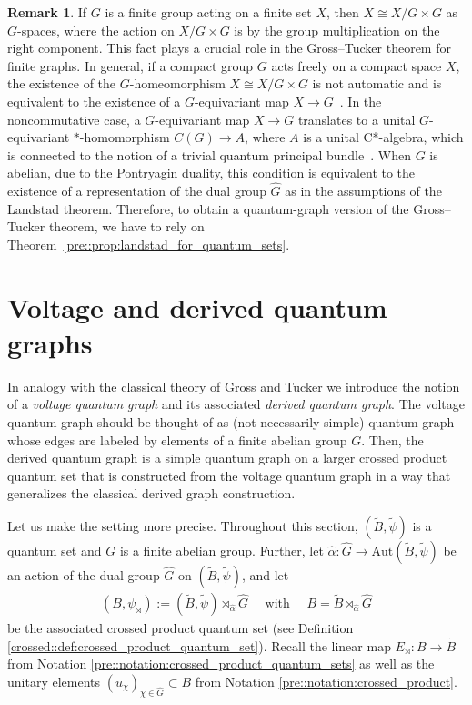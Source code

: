 \documentclass{amsart}
\theoremstyle{definition}
\newtheorem{remark}[thm]{Remark}
\theoremstyle{definition}
\begin{document}
\begin{remark}
    If $G$ is a finite group acting on a finite set $X$, then $X\cong X/G\times G$ as $G$-spaces, where the action on $X/G\times G$ is by the group multiplication on the right component. This fact plays a crucial role in the Gross--Tucker theorem for finite graphs. In general, if a compact group $G$ acts freely on a compact space $X$, the existence of the $G$-homeomorphism $X\cong X/G\times G$ is not automatic and is equivalent to the existence of a $G$-equivariant map $X\to G$~\cite{husemoller_bundles_1994}. In the noncommutative case, a $G$-equivariant map $X\to G$ translates to a unital $G$-equivariant $*$-homomorphism $C(G)\to A$, where $A$ is a unital C*-algebra, which is connected to the notion of a trivial quantum principal bundle~\cite{baum_hajac_dabrowski_bu_2015}. When $G$ is abelian, due to the Pontryagin duality, this condition is equivalent to the existence of a representation of the dual group $\hat{G}$ as in the assumptions of the Landstad theorem. Therefore, to obtain a quantum-graph version of the Gross--Tucker theorem, we have to rely on Theorem~\ref{pre::prop:landstad_for_quantum_sets}.
\end{remark}


\section{Voltage and derived quantum graphs}
\label{sec::qvoltage_and_derived_graphs}

In analogy with the classical theory of Gross and Tucker we introduce the notion of a \emph{voltage quantum graph} and its associated \emph{derived quantum graph}. The voltage quantum graph should be thought of as (not necessarily simple) quantum graph whose edges are labeled by elements of a finite abelian group $G$. Then, the derived quantum graph is a simple quantum graph on a larger crossed product quantum set that is constructed from the voltage quantum graph in a way that generalizes the classical derived graph construction.

Let us make the setting more precise. Throughout this section, $(\tilde{B}, \tilde{\psi})$ is a quantum set and $G$ is a finite abelian group. Further, let $\hat{\alpha}: \hat{G} \to \mathrm{Aut}(\tilde{B}, \tilde{\psi})$ be an action of the dual group $\hat{G}$ on $(\tilde{B}, \tilde{\psi})$, and let
\begin{align*}
    (B, \psi_\rtimes) := (\tilde{B}, \tilde{\psi}) \rtimes_{\hat{\alpha}} \hat{G}
    \quad \text{ with } \quad
    B = \tilde{B} \rtimes_{\hat{\alpha}} \hat{G}
\end{align*}
be the associated crossed product quantum set (see Definition \ref{crossed::def:crossed_product_quantum_set}). Recall the linear map $E_\rtimes: B \to \tilde{B}$ from Notation \ref{pre::notation:crossed_product_quantum_sets} as well as the unitary elements $(u_\chi)_{\chi \in \hat{G}} \subset B$ from Notation \ref{pre::notation:crossed_product}.
\end{document}
